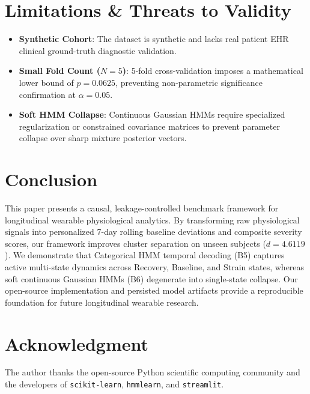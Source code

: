 \documentclass[conference]{IEEEtran}
\begin{document}
\section{Limitations \& Threats to Validity}

\begin{itemize}
    \item \textbf{Synthetic Cohort}: The dataset is synthetic and lacks real patient EHR clinical ground-truth diagnostic validation.
    \item \textbf{Small Fold Count ($N=5$)}: 5-fold cross-validation imposes a mathematical lower bound of $p = 0.0625$, preventing non-parametric significance confirmation at $\alpha = 0.05$.
    \item \textbf{Soft HMM Collapse}: Continuous Gaussian HMMs require specialized regularization or constrained covariance matrices to prevent parameter collapse over sharp mixture posterior vectors.
\end{itemize}

\section{Conclusion}

This paper presents a causal, leakage-controlled benchmark framework for longitudinal wearable physiological analytics. By transforming raw physiological signals into personalized 7-day rolling baseline deviations and composite severity scores, our framework improves cluster separation on unseen subjects ($d = 4.6119$). We demonstrate that Categorical HMM temporal decoding (B5) captures active multi-state dynamics across Recovery, Baseline, and Strain states, whereas soft continuous Gaussian HMMs (B6) degenerate into single-state collapse. Our open-source implementation and persisted model artifacts provide a reproducible foundation for future longitudinal wearable research.

\section*{Acknowledgment}
The author thanks the open-source Python scientific computing community and the developers of \texttt{scikit-learn}, \texttt{hmmlearn}, and \texttt{streamlit}.
\end{document}
